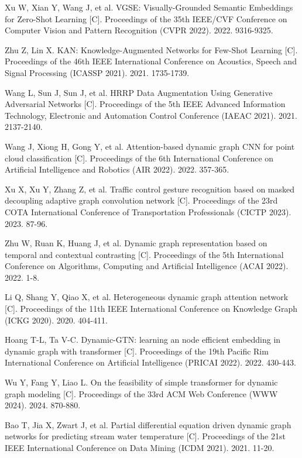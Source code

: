 \documentclass[doctor,twoside,ttf]{nudtpaper}
\begin{document}
\begin{thebibliography}{99}
 Xu W, Xian Y, Wang J, et al. VGSE: Visually-Grounded Semantic Embeddings for Zero-Shot Learning [C]. Proceedings of the 35th IEEE/CVF Conference on Computer Vision and Pattern Recognition (CVPR 2022). 2022. 9316-9325.

 Zhu Z, Lin X. KAN: Knowledge-Augmented Networks for Few-Shot Learning [C]. Proceedings of the 46th IEEE International Conference on Acoustics, Speech and Signal Processing (ICASSP 2021). 2021. 1735-1739.

 Wang L, Sun J, Sun J, et al. HRRP Data Augmentation Using Generative Adversarial Networks [C]. Proceedings of the 5th IEEE Advanced Information Technology, Electronic and Automation Control Conference (IAEAC 2021). 2021. 2137-2140.

 Wang J, Xiong H, Gong Y, et al. Attention-based dynamic graph CNN for point cloud classification [C]. Proceedings of the 6th International Conference on Artificial Intelligence and Robotics (AIR 2022). 2022. 357-365.

 Xu X, Xu Y, Zhang Z, et al. Traffic control gesture recognition based on masked decoupling adaptive graph convolution network [C]. Proceedings of the 23rd COTA International Conference of Transportation Professionals (CICTP 2023). 2023. 87-96.

 Zhu W, Ruan K, Huang J, et al. Dynamic graph representation based on temporal and contextual contrasting [C]. Proceedings of the 5th International Conference on Algorithms, Computing and Artificial Intelligence (ACAI 2022). 2022. 1-8.

 Li Q, Shang Y, Qiao X, et al. Heterogeneous dynamic graph attention network [C]. Proceedings of the 11th IEEE International Conference on Knowledge Graph (ICKG 2020). 2020. 404-411.

 Hoang T-L, Ta V-C. Dynamic-GTN: learning an node efficient embedding in dynamic graph with transformer [C]. Proceedings of the 19th Pacific Rim International Conference on Artificial Intelligence (PRICAI 2022). 2022. 430-443.

 Wu Y, Fang Y, Liao L. On the feasibility of simple transformer for dynamic graph modeling [C]. Proceedings of the 33rd ACM Web Conference (WWW 2024). 2024. 870-880.

 Bao T, Jia X, Zwart J, et al. Partial differential equation driven dynamic graph networks for predicting stream water temperature [C]. Proceedings of the 21st IEEE International Conference on Data Mining (ICDM 2021). 2021. 11-20.


\end{thebibliography}
\end{document}
